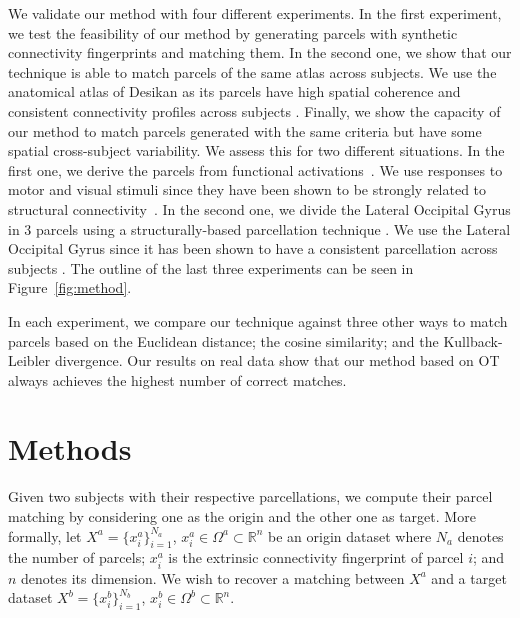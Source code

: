 We validate our method with four different experiments. In the first experiment, we test the feasibility of our method by generating parcels with synthetic connectivity fingerprints and matching them. In the second one, we show that our technique is able to match parcels of the same atlas across subjects. We use the anatomical atlas of Desikan \cite{Desikan2006} as its parcels have high spatial coherence and consistent connectivity profiles across subjects \cite{DeReus2013}. Finally, we show the capacity of our method to match parcels generated with the same criteria but have some spatial cross-subject variability. We assess this for two different situations. In the first one, we derive the parcels from functional activations~\cite{Barch2013}. We use responses to motor and visual stimuli since they have been shown to be strongly related to structural connectivity~\cite{Osher2016, Penfield1954}. In the second one, we divide the Lateral Occipital Gyrus in 3 parcels using a structurally-based parcellation technique  \cite{Gallardo2017a}. We use the Lateral Occipital Gyrus since it has been shown to have a consistent parcellation across subjects \cite{ThiebautdeSchotten2016, Gallardo2017a}. The outline of the last three experiments can be seen in Figure~\ref{fig:method}.

In each experiment, we compare our technique against three other ways to match parcels based on the Euclidean distance; the cosine similarity; and the Kullback-Leibler divergence. Our results on real data show that our method based on OT always achieves the highest number of correct matches.


\section{Methods}

Given two subjects with their respective parcellations, we compute their parcel matching by considering one as the origin and the other one as target. 
More formally, let $X^a = \{x^a_i\}_{i=1}^{N_a}$, $x^a_i \in \Omega^a \subset \mathbb{R}^n$ be an origin dataset where $N_a$ denotes the number of parcels; $x^a_i$ is the extrinsic connectivity fingerprint of parcel $i$; and $n$ denotes its dimension. We wish to recover a matching between $X^a$ and a target dataset ${X^b = \{x^b_i\}_{i=1}^{N_b}}$, $x^b_i \in \Omega^b \subset \mathbb{R}^n$.

